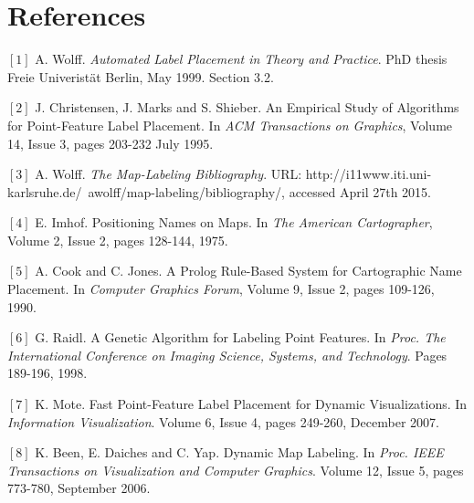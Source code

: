 \documentclass[crop=false,a4paper,oneside,11pt]{standalone}
\begin{document}
\section{References}
$[1]$ A. Wolff. \emph{Automated Label Placement in Theory and Practice}. PhD thesis Freie Univeristät Berlin, May 1999. Section 3.2.

$[2]$ J. Christensen, J. Marks and S. Shieber. An Empirical Study of Algorithms for Point-Feature Label Placement. In \emph{ACM Transactions on Graphics}, Volume 14, Issue 3, pages 203-232 July 1995.

$[3]$ A. Wolff. \emph{The Map-Labeling Bibliography}. URL: http://i11www.iti.uni-karlsruhe.de/~awolff/map-labeling/bibliography/, accessed April 27th 2015.

$[4]$ E. Imhof. Positioning Names on Maps. In \emph{The American Cartographer}, Volume 2, Issue 2, pages 128-144, 1975.

$[5]$ A. Cook and C. Jones. A Prolog Rule-Based System for Cartographic Name Placement. In \emph{Computer Graphics Forum}, Volume 9, Issue 2, pages 109-126, 1990.

$[6]$ G. Raidl. A Genetic Algorithm for Labeling Point Features. In \emph{Proc. The International Conference on Imaging Science, Systems, and Technology}. Pages 189-196, 1998.

$[7]$ K. Mote. Fast Point-Feature Label Placement for Dynamic Visualizations. In \emph{Information Visualization}. Volume 6, Issue 4, pages 249-260, December 2007.

$[8]$ K. Been, E. Daiches and C. Yap. Dynamic Map Labeling. In \emph{Proc. IEEE Transactions on Visualization and Computer Graphics}. Volume 12, Issue 5, pages 773-780, September 2006.
\end{document}
